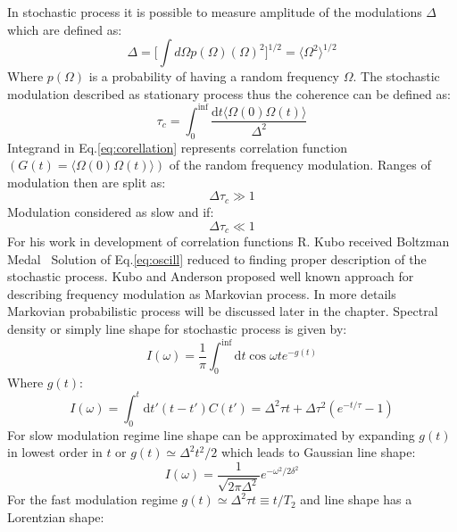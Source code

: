 In stochastic process it is possible to measure amplitude of the modulations $\Delta$ which are defined as:
\begin{equation}\label{eq:harmonoscill}
\Delta=\Big[\int d\Omega p(\Omega)(\Omega)^2\Big]^{1/2}=\langle\Omega^2\rangle^{1/2} 
\end{equation}
Where $p(\Omega)$ is a probability of having a random frequency $\Omega$. The stochastic modulation described as stationary process thus the coherence can be defined as: 
\begin{equation}\label{eq:corellation}
\tau_c=\int_0^{\inf} \frac{\mathrm{d}t\langle\Omega(0)\Omega(t)\rangle}{\Delta^2}
\end{equation}
Integrand in Eq.\ref{eq:corellation} represents correlation function $(G(t)=\langle\Omega(0)\Omega(t)\rangle)$ of the random frequency modulation. Ranges of modulation then are split as: 
\begin{equation}\label{eq:slowmodulation}
\Delta \tau_c \gg 1
\end{equation}
Modulation considered as slow and if: 
\begin{equation}\label{eq:fastmodulation}
\Delta \tau_c \ll 1
\end{equation}
For his work in development of correlation functions R. Kubo received Boltzman Medal~\cite{kubo2} Solution of Eq.\ref{eq:oscill} reduced to finding proper description of the stochastic process. Kubo and Anderson proposed well known approach for describing frequency modulation as Markovian process. In more details Markovian probabilistic process will be discussed later in the chapter. Spectral density or simply line shape for stochastic process is given by: 
\begin{equation}\label{eq:fastmodulation1}
I(\omega)=\frac{1}{\pi}\int_0^{\inf}\mathrm{d}t\cos\omega te^{-g(t)}
\end{equation}
Where $g(t)$:
\begin{equation}\label{eq:fastmodulation2}
I(\omega)=\int_0^{t}\mathrm{d}t'(t-t')C(t')=\Delta^2\tau t+\Delta\tau^2(e^{-t/\tau}-1)
\end{equation}
For slow modulation regime line shape can be approximated by expanding $g(t)$ in lowest order in $t$ or $g(t)\simeq \Delta^2t^2/2$ which leads to Gaussian line shape: 
\begin{equation}\label{eq:fastmodulation3}
I(\omega)=\frac{1}{\sqrt{2\pi\Delta^2}}e^{-\omega^2/2\delta^2}
\end{equation} 
For the fast modulation regime $g(t)\simeq \Delta^2\tau t\equiv t/T_2$ and line shape has a Lorentzian shape: 
